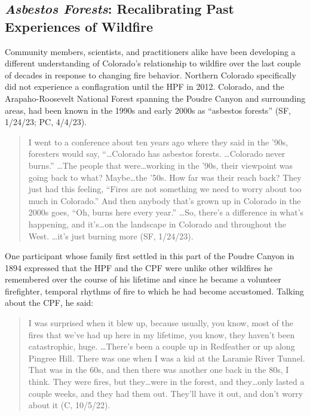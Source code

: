 \documentclass[
]{article}
\begin{document}
\subsection{\texorpdfstring{\emph{Asbestos Forests}: Recalibrating Past Experiences of Wildfire}{Asbestos Forests: Recalibrating Past Experiences of Wildfire}}\label{asbestos-forests-recalibrating-past-experiences-of-wildfire}

Community members, scientists, and practitioners alike have been developing a different understanding of Colorado's relationship to wildfire over the last couple of decades in response to changing fire behavior. Northern Colorado specifically did not experience a conflagration until the HPF in 2012. Colorado, and the Arapaho-Roosevelt National Forest spanning the Poudre Canyon and surrounding areas, had been known in the 1990s and early 2000s as ``asbestos forests'' (SF, 1/24/23; PC, 4/4/23).

\begin{quote}
I went to a conference about ten years ago where they said in the '90s, foresters would say, ``\ldots Colorado has asbestos forests. \ldots Colorado never burns.'' \ldots The people that were\ldots working in the '90s, their viewpoint was going back to what? Maybe\ldots the '50s. How far was their reach back? They just had this feeling, ``Fires are not something we need to worry about too much in Colorado.'' And then anybody that's grown up in Colorado in the 2000s goes, ``Oh, burns here every year.'' \ldots So, there's a difference in what's happening, and it's\ldots on the landscape in Colorado and throughout the West. \ldots it's just burning more (SF, 1/24/23).
\end{quote}

One participant whose family first settled in this part of the Poudre Canyon in 1894 expressed that the HPF and the CPF were unlike other wildfires he remembered over the course of his lifetime and since he became a volunteer firefighter, temporal rhythms of fire to which he had become accustomed. Talking about the CPF, he said:

\begin{quote}
I was surprised when it blew up, because usually, you know, most of the fires that we've had up here in my lifetime, you know, they haven't been catastrophic, huge. \ldots There's been a couple up in Redfeather or up along Pingree Hill. There was one when I was a kid at the Laramie River Tunnel. That was in the 60s, and then there was another one back in the 80s, I think. They were fires, but they\ldots were in the forest, and they\ldots only lasted a couple weeks, and they had them out. They'll have it out, and don't worry about it (C, 10/5/22).
\end{quote}
\end{document}
